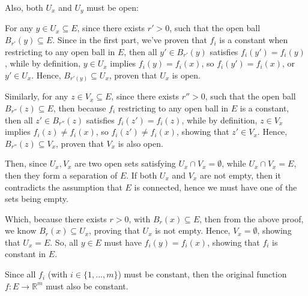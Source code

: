 \documentclass{article}
\begin{document}
Also, both $U_x$ and $U_y$ must be open: 

For any $y\in U_x\subseteq E$, since there exists $r'>0$, such that the open ball $B_{r'}(y)\subseteq E$. Since in the first part, we've proven that $f_i$ is a constant when restricting to any open ball in $E$,
then all $y'\in B_{r'}(y)$ satisfies $f_i(y')=f_i(y)$, while by definition, $y\in U_x$ implies $f_i(y)=f_i(x)$, so $f_i(y')=f_i(x)$, or $y'\in U_x$.
Hence, $B_{r'(y)}\subseteq U_x$, proven that $U_x$ is open.

Similarly, for any $z\in V_x\subseteq E$, since there exists $r''>0$, such that the open ball $B_{r''}(z)\subseteq E$, then because $f_i$ restricting to any open ball in $E$ is a constant,
then all $z'\in B_{r''}(z)$ satisfies $f_i(z')=f_i(z)$, while by definition, $z\in V_x$ implies $f_i(z)\neq f_i(x)$, so $f_i(z')\neq f_i(x)$, showing that $z'\in V_x$.
Hence, $B_{r''}(z)\subseteq V_x$, proven that $V_x$ is also open.

Then, since $U_x,V_x$ are two open sets satisfying $U_x\cap V_x = \emptyset$, while $U_x\cap V_x=E$, then they form a separation of $E$. If both $U_x$ and $V_x$ are not empty, then it contradicts the assumption that $E$ is connected,
hence we must have one of the sets being empty.

Which, because there exists $r>0$, with $B_r(x)\subseteq E$, then from the above proof, we know $B_r(x)\subseteq U_x$, proving that $U_x$ is not empty. Hence, $V_x=\emptyset$, showing that $U_x=E$.
So, all $y\in E$ must have $f_i(y)=f_i(x)$, showing that $f_i$ is constant in $E$.

\hfil

Since all $f_i$ (with $i\in \{1,...,m\}$) must be constant, then the original function $f:E\rightarrow\mathbb{R}^m$ must also be constant.

\hfil

\hfil
\end{document}
